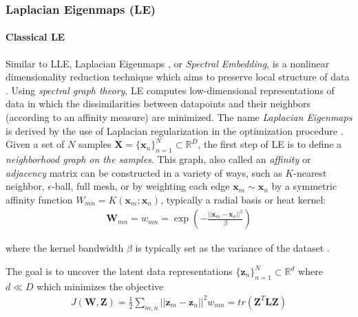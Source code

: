 \subsubsection{Laplacian Eigenmaps (LE)} \label{sec:Laplacian_Eigenmaps}
\paragraph{Classical LE}
Similar to LLE, Laplacian Eigenmaps \citep{Belkin2003LaplacianEigenmaps}, or \textit{Spectral Embedding}, is a nonlinear dimensionality reduction technique which aims to preserve local structure of data \citep{Raducanu2012SupervisedNonlinearDimReduction,VanDerMaaten2009DRReview}.  Using \textit{spectral graph theory}, LE computes low-dimensional representations of data in which the dissimilarities between datapoints and their neighbors (according to an affinity measure) are minimized.  The name \textit{Laplacian Eigenmaps} is derived by the use of Laplacian regularization in the optimization procedure \citep{Thorstensen2009ManifoldThesis}. Given a set of $N$ samples $\bm{X} = \{\bm{x}_n\}^{N}_{n=1} \subset \mathbb{R}^{D}$, the first step of LE is to define a \textit{neighborhood graph on the samples}.  This graph, also called an \textit{affinity} or \textit{adjacency} matrix can be constructed in a variety of ways, such as $K$-nearest neighbor, $\epsilon$-ball, full mesh, or by weighting each edge $\bm{x}_m \sim \bm{x}_n$ by a symmetric affinity function $W_{mn} = K(\bm{x}_m;\bm{x}_n)$, typically a radial basis or heat kernel:
\begin{align}
	\bm{W}_{mn}= w_{mn} = \exp \left ( - \frac{|| \bm{x}_m - \bm{x}_n ||^{2}}{\beta}  \right )
\end{align}

\noindent
where the kernel bandwidth $\beta$ is typically set as the variance of the dataset \citep{Raducanu2012SupervisedNonlinearDimReduction,Thorstensen2009ManifoldThesis}.

The goal is to uncover the latent data representations $\{ \bm{z}_n \}^{N}_{n=1} \subset \mathbb{R}^{d}$ where $d \ll D$ which minimizes the objective 
\begin{align}
	J(\bm{W},\bm{Z}) = \frac{1}{2} \sum_{m,n}^{}||\bm{z}_{m} - \bm{z}_{n} ||^{2}w_{mn} = tr(\bm{Z}^{T}\bm{L}\bm{Z})
\end{align}

